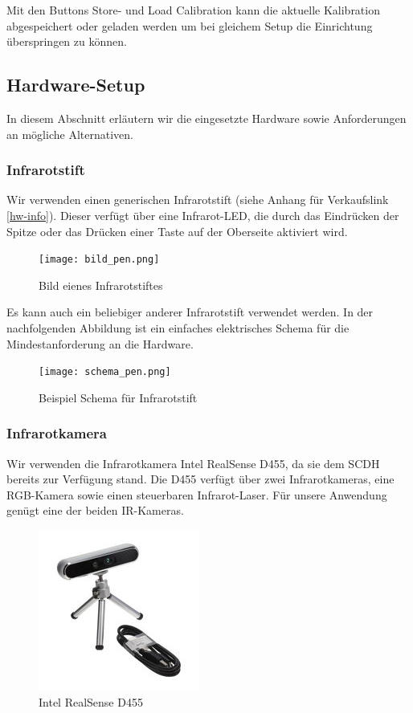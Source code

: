 Mit den Buttons Store- und Load Calibration kann die aktuelle Kalibration abgespeichert oder geladen werden um bei gleichem Setup die Einrichtung überspringen zu können.

\subsection{Hardware-Setup}
In diesem Abschnitt erläutern wir die eingesetzte Hardware sowie Anforderungen an mögliche Alternativen.

\vspace{0.5em}
\subsubsection{Infrarotstift}
Wir verwenden einen generischen Infrarotstift (siehe Anhang für Verkaufslink \ref{hw-info}). Dieser verfügt über eine Infrarot-LED, die durch das Eindrücken der Spitze oder das Drücken einer Taste auf der Oberseite aktiviert wird.

\begin{figure}[H]
    \centering
    \texttt{[image: bild\_pen.png]}
    \caption{Bild eienes Infrarotstiftes}
    \label{fig:enter-label}
\end{figure}

Es kann auch ein beliebiger anderer Infrarotstift verwendet werden. In der nachfolgenden Abbildung ist ein einfaches elektrisches Schema für die Mindestanforderung an die Hardware.

\begin{figure}[H]
    \centering
    \texttt{[image: schema\_pen.png]}
    \caption{Beispiel Schema für Infrarotstift}
    \label{fig:enter-label}
\end{figure}


\clearpage
\subsubsection{Infrarotkamera}

Wir verwenden die Infrarotkamera Intel RealSense D455, da sie dem SCDH bereits zur Verfügung stand. Die D455 verfügt über zwei Infrarotkameras, eine RGB-Kamera sowie einen steuerbaren Infrarot-Laser. Für unsere Anwendung genügt eine der beiden IR-Kameras.

\begin{figure}[H]
    \centering
    \includegraphics[width=0.5\linewidth]{graphics/bild_d455.jpg}
    \caption{Intel RealSense D455}
    \label{fig:enter-label}
\end{figure}

